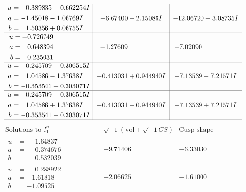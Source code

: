 \documentclass[1p]{elsarticle_modified}
\theoremstyle{definition}
\newcommand{\I}{\sqrt{-1}}
\begin{document}
$$\begin{array}{c|c|c}
\begin{aligned}
u &= -0.389835 - 0.662254 I \\
a &= -1.45018 - 1.06769 I \\
b &= \phantom{-}1.50356 + 0.06755 I\end{aligned}
 & -6.67400 - 2.15086 I & -12.06720 + 3.08735 I \\ \hline\begin{aligned}
u &= -0.726749\phantom{ +0.000000I} \\
a &= \phantom{-}0.648394\phantom{ +0.000000I} \\
b &= \phantom{-}0.235031\phantom{ +0.000000I}\end{aligned}
 & -1.27609\phantom{ +0.000000I} & -7.02090\phantom{ +0.000000I} \\ \hline\begin{aligned}
u &= -0.245709 + 0.306515 I \\
a &= \phantom{-}1.04586 - 1.37638 I \\
b &= -0.353541 + 0.303071 I\end{aligned}
 & -0.413031 + 0.944940 I & -7.13539 - 7.21571 I \\ \hline\begin{aligned}
u &= -0.245709 - 0.306515 I \\
a &= \phantom{-}1.04586 + 1.37638 I \\
b &= -0.353541 - 0.303071 I\end{aligned}
 & -0.413031 - 0.944940 I & -7.13539 + 7.21571 I\\
 \hline 
 \end{array}$$\newpage$$\begin{array}{c|c|c}  
\text{Solutions to }I^u_{1}& \I (\text{vol} + \sqrt{-1}CS) & \text{Cusp shape}\\
 \hline 
\begin{aligned}
u &= \phantom{-}1.64837\phantom{ +0.000000I} \\
a &= \phantom{-}0.374676\phantom{ +0.000000I} \\
b &= \phantom{-}0.532039\phantom{ +0.000000I}\end{aligned}
 & -9.71406\phantom{ +0.000000I} & -6.33030\phantom{ +0.000000I} \\ \hline\begin{aligned}
u &= \phantom{-}0.288922\phantom{ +0.000000I} \\
a &= -1.61818\phantom{ +0.000000I} \\
b &= -1.09525\phantom{ +0.000000I}\end{aligned}
 & -2.06625\phantom{ +0.000000I} & -1.61000\phantom{ +0.000000I} \\ \hline\begin{aligned}

\end{aligned}
\end{array}$$
\end{document}
